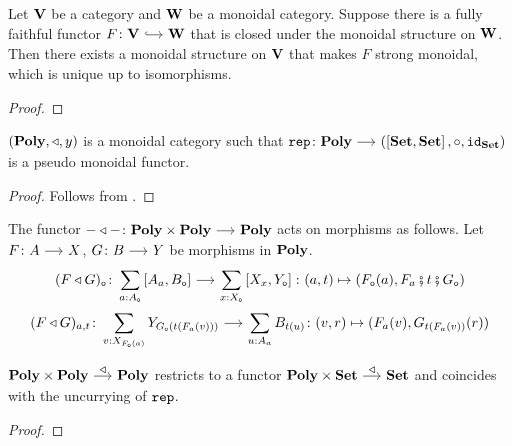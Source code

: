 \documentclass[a4paper,dvipsnames, 11pt]{amsart} %
\begin{document}
\begin{proposition}
	\label{prop:FFInducesMoncat}
	Let $\mathbf{V}$ be a category and $\mathbf{W}$ be a monoidal category.
	Suppose there is a fully faithful functor $F\colon\one{V}\arr[hook]\one{W}$
	that is closed under the monoidal structure on $\mathbf{W}$.
	Then there exists a monoidal structure on $\mathbf{V}$ that makes $F$ strong monoidal,
	which is unique up to isomorphisms.
\end{proposition}
\begin{proof}
\end{proof}
\begin{remark}
\begin{proposition}
	\label{prop:PolyMonoidalCaty}
	$(\mathbf{Poly},\triangleleft,y)$ is a monoidal category
	such that $\rep\colon\Poly\arr\left(\left[\Set,\Set\right],\circ,\id_\Set\right)$ is a pseudo monoidal functor.
\end{proposition}
\begin{proof}
	Follows from .
\end{proof}
	The functor $-\trleft-\colon\Poly\times\Poly\arr\Poly$ acts on morphisms as follows.
	Let $F\colon A\arr X$, $G\colon B\arr Y$ be morphisms in $\mathbf{Poly}$.
	\[
		(F\trleft G)_\ob
		\colon
		\sum_{a\tcolon A_\ob}\left[A_a,B_\ob\right]
		\arr
		\sum_{x\tcolon X_\ob}\left[X_x,Y_\ob\right]
		\colon
		(a,t)\mapsto\left(F_\ob(a),F_{a}\fatsemi t\fatsemi G_{\ob}\right)
	\]
	\[
		(F\trleft G)_{a,t}\colon
		\sum_{v\tcolon X_{F_\ob(a)}}Y_{G_\ob(t(F_{a}(v)))}
		\arr
		\sum_{u\tcolon A_{a}}B_{t(u)}
		\colon
		(v,r)
		\mapsto
		(F_a(v),G_{t(F_a(v))}(r))
	\]
\end{remark}
\begin{lemma}
	\label{lem:trleftRestSets}
	$\Poly\times\Poly\arr"\trleft"\Poly$
	restricts to a functor
	$\Poly\times\Set\arr"\trleft"\Set$
	and coincides with the uncurrying of $\mathtt{rep}$.
\end{lemma}
\begin{proof}
\end{proof}
\end{document}
